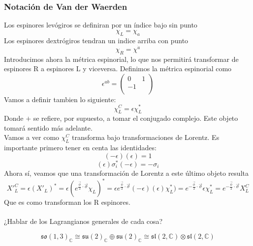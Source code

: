 \documentclass[12pt]{article}
\begin{document}
\subsubsection{Notación de Van der Waerden}
Los espinores levógiros se definiran por un índice bajo sin punto 
$$\chi_L=\chi_a$$
Los espinores dextrógiros tendran un indice arriba con punto
$$\chi_R=\chi^{\dot{a}}$$
Introducimos ahora la métrica espinorial, lo que nos permitirá transformar de espinores R a espinores L y viceversa. Definimos la métrica espinorial como
$$\epsilon^{ab}=\begin{pmatrix}
	0 & 1 \\ -1 & \\
\end{pmatrix}$$
Vamos a definir tambien lo siguiente:
$$\chi_L^C=\epsilon\chi_L^*$$
Donde $+$ se refiere, por supuesto, a tomar el conjugado complejo. Este objeto tomará sentido más adelante.\\
Vamos a ver como $\chi^C_L$ transforma bajo transformaciones de Lorentz. Es importante primero tener en centa las identidades:
$$ (-\epsilon)(\epsilon)=1$$
$$(\epsilon)\sigma_i^*(-\epsilon)=-\sigma_i$$
Ahora sí, veamos que una transformación de Lorentz a este último objeto resulta
$$X'^C_L=\epsilon (X'_L)^*=\epsilon(e^{\frac{\vec{\phi}}{2}\cdot\vec{\sigma}}\chi_L)^*=\epsilon e^{\frac{\vec{\phi}}{2}\cdot\vec{\sigma}}(-\epsilon)(\epsilon)\chi_L^*)=e^{-\frac{\vec{\phi}}{2}\cdot\vec{\sigma}}\epsilon \chi_L^*=e^{-\frac{\vec{\phi}}{2}\cdot\vec{\sigma}}X_L^C
$$
Que es como transforman los R espinores. \\\\
¿Hablar de los Lagrangianos generales de cada cosa?

$$\mathfrak{s}\mathfrak{o}(1,3)_\mathbb{C}\cong \mathfrak{s}\mathfrak{u}(2)_ \mathbb{C} \oplus \mathfrak{s}\mathfrak{u}(2)_\mathbb{C}  \cong \mathfrak{s}\mathfrak{l}(2,\mathbb{C})\otimes \mathfrak{s}\mathfrak{l}(2,\mathbb{C})  $$
\end{document}
